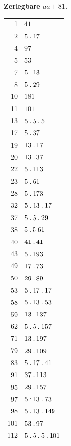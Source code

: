 %
\par{}
\begin{center}\textbf{Zerlegbare $aa+81$.}\end{center}
\begingroup\small\setlength{\tabcolsep}{5pt}
\begin{longtable}{@{}r|l@{}}
1 & $41$\\
2 & $5\mathbin{.} 17$\\
4 & $97$\\
5 & $53$\\
7 & $5\mathbin{.} 13$\\
8 & $5\mathbin{.} 29$\\
10 & $181$\\
11 & $101$\\
13 & $5\mathbin{.} 5\mathbin{.} 5$\\
17 & $5\mathbin{.} 37$\\
19 & $13\mathbin{.} 17$\\
20 & $13\mathbin{.} 37$\\
22 & $5\mathbin{.} 113$\\
23 & $5\mathbin{.} 61$\\
28 & $5\mathbin{.} 173$\\
32 & $5\mathbin{.} 13\mathbin{.} 17$\\
37 & $5\mathbin{.} 5\mathbin{.} 29$\\
38 & $5\mathbin{.} 5\;61$\\
40 & $41\mathbin{.} 41$\\
43 & $5\mathbin{.} 193$\\
49 & $17\mathbin{.} 73$\\
50 & $29\mathbin{.} 89$\\
53 & $5\mathbin{.} 17\mathbin{.} 17$\\
58 & $5\mathbin{.} 13\mathbin{.} 53$\\
59 & $13\mathbin{.} 137$\\
62 & $5\mathbin{.} 5\mathbin{.} 157$\\
71 & $13\mathbin{.} 197$\\
79 & $29\mathbin{.} 109$\\
83 & $5\mathbin{.} 17\mathbin{.} 41$\\
91 & $37\mathbin{.} 113$\\
95 & $29\mathbin{.} 157$\\
97 & $5\mathbin{\raisebox{0.9ex}{.}}13\pdot 73$\\
98 & $5\mathbin{.} 13\mathbin{.} 149$\\
101 & $53\mathbin{.} 97$\\
112 & $5\mathbin{.} 5\mathbin{.} 5\mathbin{.} 101$\\

\end{longtable}

